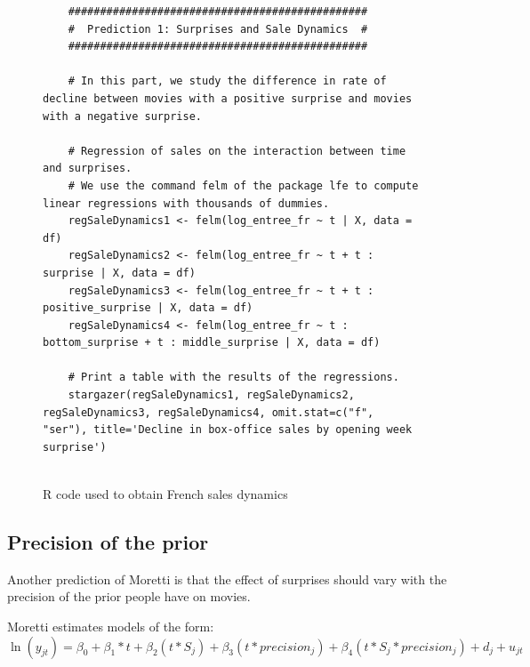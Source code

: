\begin{figure}[H]
	\caption{R code used to obtain French sales dynamics}
	\begin{lstlisting}
	###############################################
	#  Prediction 1: Surprises and Sale Dynamics  #
	###############################################
	
	# In this part, we study the difference in rate of decline between movies with a positive surprise and movies with a negative surprise.
	
	# Regression of sales on the interaction between time and surprises.
	# We use the command felm of the package lfe to compute linear regressions with thousands of dummies.
	regSaleDynamics1 <- felm(log_entree_fr ~ t | X, data = df)
	regSaleDynamics2 <- felm(log_entree_fr ~ t + t : surprise | X, data = df)
	regSaleDynamics3 <- felm(log_entree_fr ~ t + t : positive_surprise | X, data = df)
	regSaleDynamics4 <- felm(log_entree_fr ~ t : bottom_surprise + t : middle_surprise | X, data = df)
	
	# Print a table with the results of the regressions.
	stargazer(regSaleDynamics1, regSaleDynamics2, regSaleDynamics3, regSaleDynamics4, omit.stat=c("f", "ser"), title='Decline in box-office sales by opening week surprise')
	
	\end{lstlisting}
	
	
\end{figure}
\subsection{Precision of the prior}\label{subsec2.3}
Another prediction of Moretti is that the effect of surprises should vary with the precision of the prior people have on movies.

Moretti estimates models of the form: \begin{equation}\label{key}
\ln(y_{jt})=\beta_0+\beta_1*t+\beta_2(t*S_j)+\beta_3(t*precision_j)+\beta_4(t*S_j*precision_j) +d_j+u_{jt}
\end{equation}


